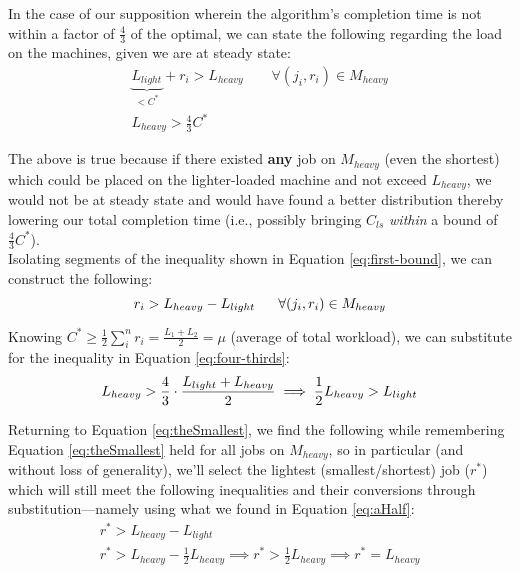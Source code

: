 \documentclass[conference]{styles/acmsiggraph}
\newcommand{\?}{\stackrel{?}{=}}
\begin{document}
In the case of our supposition wherein the algorithm's completion time is not within a factor of $\frac{4}{3}$ of the optimal, we can state the following regarding the load on the machines, given we are at steady state:
\begin{align}
    \underbrace{L_{light}}_{< C^*} + r_i > L_{heavy} \label{eq:first-bound}\ \ \ \ \ \ \ \ \ \forall (j_i,r_i) \in M_{heavy}\\
    L_{heavy} > \frac{4}{3}C^* \label{eq:four-thirds}
\end{align}

The above is true because if there existed \textbf{any} job on $M_{heavy}$ (even the shortest) which could be placed on the lighter-loaded machine and not exceed $L_{heavy}$, we would not be at steady state and would have found a better distribution thereby lowering our total completion time (i.e., possibly bringing $C_{ls}$ \textit{within} a bound of $\frac{4}{3}C^*$).\\

Isolating segments of the inequality shown in Equation \ref{eq:first-bound}, we can construct the following:
\begin{equation}
    r_{i} > L_{heavy} - L_{light} \label{eq:theSmallest}\ \ \ \ \ \forall (j_i,r_i) \in M_{heavy}\\
\end{equation}

Knowing $C^* \geq \frac{1}{2}\sum_{i}^{n}r_i = \frac{L_1 + L_2}{2} = \mu$ (average of total workload), we can substitute for the inequality in Equation \ref{eq:four-thirds}:
\begin{equation}
   L_{heavy}  > \frac{4}{3}\cdot\frac{L_{light} + L_{heavy}}{2} \label{eq:aHalf}\\
   \implies \frac{1}{2} L_{heavy} > L_{light}
\end{equation}

Returning to Equation \ref{eq:theSmallest}, we find the following while remembering Equation \ref{eq:theSmallest} held for all jobs on $M_{heavy}$, so in particular (and without loss of generality), we'll select the lightest (smallest/shortest) job ($r^*$) which will still meet the following inequalities and their conversions through substitution---namely using what we found in Equation \ref{eq:aHalf}:
\begin{align}
    r^* > L_{heavy} - L_{light}\\
    r^* > L_{heavy} - \frac{1}{2} L_{heavy} \implies r^* > \frac{1}{2} L_{heavy} \implies \boxed{r^* \mathbf{=} L_{heavy}} \label{eq:theContradictionBegins}
\end{align}
\end{document}
